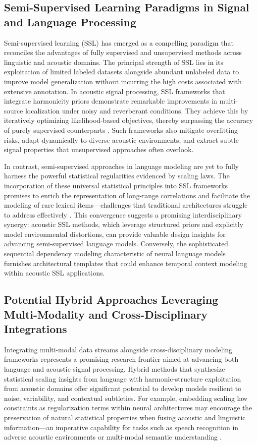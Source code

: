 \documentclass[sigconf]{acmart}
\begin{document}
\subsection{Semi-Supervised Learning Paradigms in Signal and Language Processing}

Semi-supervised learning (SSL) has emerged as a compelling paradigm that reconciles the advantages of fully supervised and unsupervised methods across linguistic and acoustic domains. The principal strength of SSL lies in its exploitation of limited labeled datasets alongside abundant unlabeled data to improve model generalization without incurring the high costs associated with extensive annotation. In acoustic signal processing, SSL frameworks that integrate harmonicity priors demonstrate remarkable improvements in multi-source localization under noisy and reverberant conditions. They achieve this by iteratively optimizing likelihood-based objectives, thereby surpassing the accuracy of purely supervised counterparts \cite{ref52}. Such frameworks also mitigate overfitting risks, adapt dynamically to diverse acoustic environments, and extract subtle signal properties that unsupervised approaches often overlook.

In contrast, semi-supervised approaches in language modeling are yet to fully harness the powerful statistical regularities evidenced by scaling laws. The incorporation of these universal statistical principles into SSL frameworks promises to enrich the representation of long-range correlations and facilitate the modeling of rare lexical items—challenges that traditional architectures struggle to address effectively \cite{ref51}. This convergence suggests a promising interdisciplinary synergy: acoustic SSL methods, which leverage structured priors and explicitly model environmental distortions, can provide valuable design insights for advancing semi-supervised language models. Conversely, the sophisticated sequential dependency modeling characteristic of neural language models furnishes architectural templates that could enhance temporal context modeling within acoustic SSL applications.

\subsection{Potential Hybrid Approaches Leveraging Multi-Modality and Cross-Disciplinary Integrations}

Integrating multi-modal data streams alongside cross-disciplinary modeling frameworks represents a promising research frontier aimed at advancing both language and acoustic signal processing. Hybrid methods that synthesize statistical scaling insights from language with harmonic-structure exploitation from acoustic domains offer significant potential to develop models resilient to noise, variability, and contextual subtleties. For example, embedding scaling law constraints as regularization terms within neural architectures may encourage the preservation of natural statistical properties when fusing acoustic and linguistic information—an imperative capability for tasks such as speech recognition in adverse acoustic environments or multi-modal semantic understanding \cite{ref51,ref52}.
\end{document}
